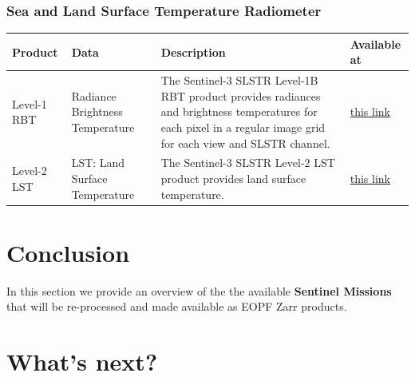 \documentclass[
  letterpaper,
  DIV=11,
  numbers=noendperiod]{scrreprt}
\begin{document}
\subsubsection{Sea and Land Surface Temperature
Radiometer}\label{sea-and-land-surface-temperature-radiometer}

\begin{longtable}[]{@{}
  >{\raggedright\arraybackslash}p{}
  >{\raggedright\arraybackslash}p{}
  >{\raggedright\arraybackslash}p{}
  >{\raggedright\arraybackslash}p{}@{}}
\toprule\noalign{}
\begin{minipage}[b]{\linewidth}\raggedright
Product
\end{minipage} & \begin{minipage}[b]{\linewidth}\raggedright
Data
\end{minipage} & \begin{minipage}[b]{\linewidth}\raggedright
Description
\end{minipage} & \begin{minipage}[b]{\linewidth}\raggedright
Available at
\end{minipage} \\
\midrule\noalign{}
\endhead
\bottomrule\noalign{}
\endlastfoot
Level-1 RBT & Radiance Brightness Temperature & The Sentinel-3 SLSTR
Level-1B RBT product provides radiances and brightness temperatures for
each pixel in a regular image grid for each view and SLSTR channel. &
\href{https://stac.browser.user.eopf.eodc.eu/collections/sentinel-3-slstr-l1-rbt}{this
link} \\
Level-2 LST & LST: Land Surface Temperature & The Sentinel-3 SLSTR
Level-2 LST product provides land surface temperature. &
\href{https://stac.browser.user.eopf.eodc.eu/collections/sentinel-3-slstr-l2-lst}{this
link} \\
\end{longtable}

\section{Conclusion}\label{conclusion-2}

In this section we provide an overview of the the available
\textbf{Sentinel Missions} that will be re-processed and made available
as EOPF Zarr products.

\section{What's next?}\label{whats-next-2}
\end{document}
